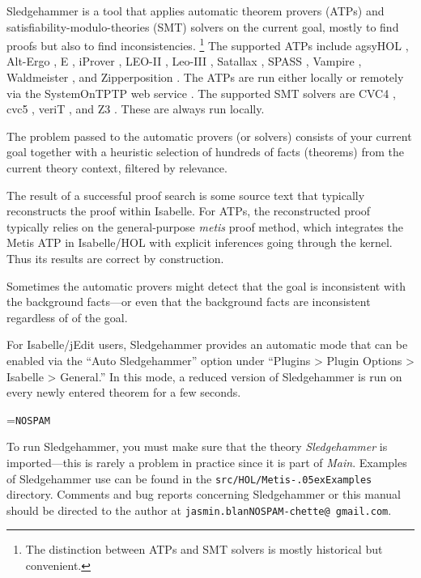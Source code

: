 \documentclass[a4paper,12pt]{article}
\renewcommand\_{\hbox{\textunderscore\kern-.05ex}}
\begin{document}
Sledgehammer is a tool that applies automatic theorem provers (ATPs)
and satisfiability-modulo-theories (SMT) solvers on the current goal, mostly
to find proofs but also to find inconsistencies.%
\footnote{The distinction between ATPs and SMT solvers is mostly
historical but convenient.}
%
The supported ATPs include agsyHOL \cite{agsyHOL}, Alt-Ergo \cite{alt-ergo}, E
\cite{schulz-2019}, iProver \cite{korovin-2009}, LEO-II \cite{leo2}, Leo-III
\cite{leo3}, Satallax \cite{satallax}, SPASS \cite{weidenbach-et-al-2009},
Vampire \cite{riazanov-voronkov-2002}, Waldmeister \cite{waldmeister}, and
Zipperposition \cite{cruanes-2014}. The ATPs are run either locally or remotely
via the System\-On\-TPTP web service \cite{sutcliffe-2000}. The supported SMT
solvers are CVC4 \cite{cvc4}, cvc5 \cite{barbosa-et-al-cvc5}, veriT
\cite{bouton-et-al-2009}, and Z3 \cite{de-moura-2008}. These are always run
locally.

The problem passed to the automatic provers (or solvers) consists of your
current goal together with a heuristic selection of hundreds of facts (theorems)
from the current theory context, filtered by relevance.

The result of a successful proof search is some source text that typically
reconstructs the proof within Isabelle. For ATPs, the reconstructed proof
typically relies on the general-purpose \textit{metis} proof method, which
integrates the Metis ATP in Isabelle/HOL with explicit inferences going through
the kernel. Thus its results are correct by construction.

Sometimes the automatic provers might detect that the goal is inconsistent with
the background facts---or even that the background facts are inconsistent
regardless of of the goal.

For Isabelle/jEdit users, Sledgehammer provides an automatic mode that can be
enabled via the ``Auto Sledgehammer'' option under ``Plugins > Plugin Options >
Isabelle > General.'' In this mode, a reduced version of Sledgehammer is run on
every newly entered theorem for a few seconds.

\newbox\boxA
\setbox\boxA=\hbox{\texttt{NOSPAM}}

\newcommand\authoremail{\texttt{jasmin.blan{\color{white}NOSPAM}\kern-\wd\boxA{}chette@\allowbreak
gmail.\allowbreak com}}

To run Sledgehammer, you must make sure that the theory \textit{Sledgehammer} is
imported---this is rarely a problem in practice since it is part of
\textit{Main}. Examples of Sledgehammer use can be found in the
\texttt{src/HOL/Metis\_Examples} directory.  Comments and bug reports
concerning Sledgehammer or this manual should be directed to the author at
\authoremail.
\end{document}
